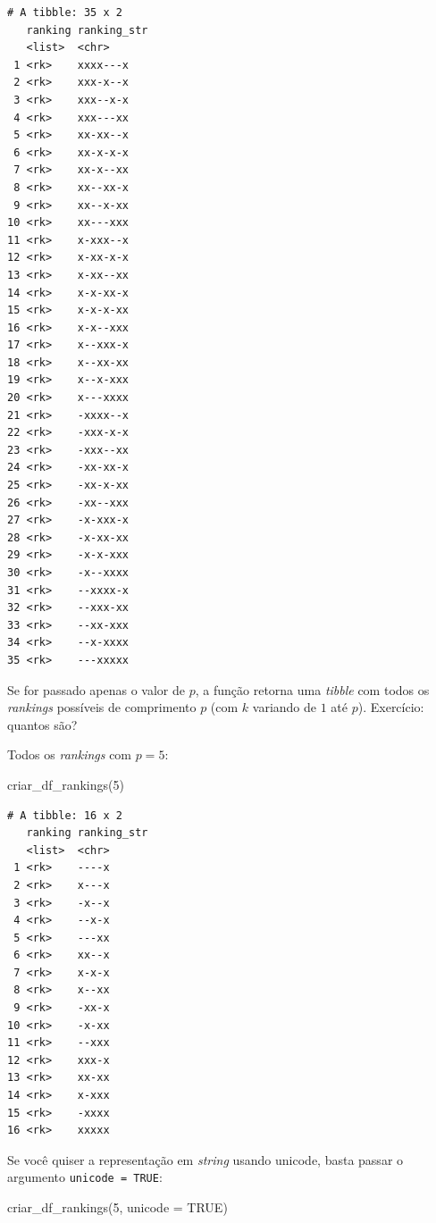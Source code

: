 \documentclass[
  letterpaper,
  DIV=11,
  numbers=noendperiod]{scrreprt}
\newenvironment{Shaded}{\begin{snugshade}}{\end{snugshade}}
\newcommand{\AttributeTok}[1]{\textcolor[rgb]{0.40,0.45,0.13}{#1}}
\newcommand{\ConstantTok}[1]{\textcolor[rgb]{0.56,0.35,0.01}{#1}}
\newcommand{\DecValTok}[1]{\textcolor[rgb]{0.68,0.00,0.00}{#1}}
\newcommand{\FunctionTok}[1]{\textcolor[rgb]{0.28,0.35,0.67}{#1}}
\newcommand{\NormalTok}[1]{\textcolor[rgb]{0.00,0.23,0.31}{#1}}
\begin{document}
\begin{verbatim}
# A tibble: 35 x 2
   ranking ranking_str
   <list>  <chr>      
 1 <rk>    xxxx---x   
 2 <rk>    xxx-x--x   
 3 <rk>    xxx--x-x   
 4 <rk>    xxx---xx   
 5 <rk>    xx-xx--x   
 6 <rk>    xx-x-x-x   
 7 <rk>    xx-x--xx   
 8 <rk>    xx--xx-x   
 9 <rk>    xx--x-xx   
10 <rk>    xx---xxx   
11 <rk>    x-xxx--x   
12 <rk>    x-xx-x-x   
13 <rk>    x-xx--xx   
14 <rk>    x-x-xx-x   
15 <rk>    x-x-x-xx   
16 <rk>    x-x--xxx   
17 <rk>    x--xxx-x   
18 <rk>    x--xx-xx   
19 <rk>    x--x-xxx   
20 <rk>    x---xxxx   
21 <rk>    -xxxx--x   
22 <rk>    -xxx-x-x   
23 <rk>    -xxx--xx   
24 <rk>    -xx-xx-x   
25 <rk>    -xx-x-xx   
26 <rk>    -xx--xxx   
27 <rk>    -x-xxx-x   
28 <rk>    -x-xx-xx   
29 <rk>    -x-x-xxx   
30 <rk>    -x--xxxx   
31 <rk>    --xxxx-x   
32 <rk>    --xxx-xx   
33 <rk>    --xx-xxx   
34 <rk>    --x-xxxx   
35 <rk>    ---xxxxx   
\end{verbatim}

Se for passado apenas o valor de $p$, a função retorna uma \emph{tibble}
com todos os \emph{rankings} possíveis de comprimento $p$ (com $k$
variando de $1$ até $p$). Exercício: quantos são?

Todos os \emph{rankings} com $p = 5$:

\begin{Shaded}
\begin{Highlighting}[]
\FunctionTok{criar\_df\_rankings}\NormalTok{(}\DecValTok{5}\NormalTok{)}
\end{Highlighting}
\end{Shaded}

\begin{verbatim}
# A tibble: 16 x 2
   ranking ranking_str
   <list>  <chr>      
 1 <rk>    ----x      
 2 <rk>    x---x      
 3 <rk>    -x--x      
 4 <rk>    --x-x      
 5 <rk>    ---xx      
 6 <rk>    xx--x      
 7 <rk>    x-x-x      
 8 <rk>    x--xx      
 9 <rk>    -xx-x      
10 <rk>    -x-xx      
11 <rk>    --xxx      
12 <rk>    xxx-x      
13 <rk>    xx-xx      
14 <rk>    x-xxx      
15 <rk>    -xxxx      
16 <rk>    xxxxx      
\end{verbatim}

Se você quiser a representação em \emph{string} usando unicode, basta
passar o argumento \texttt{unicode\ =\ TRUE}:

\begin{Shaded}
\begin{Highlighting}[]
\FunctionTok{criar\_df\_rankings}\NormalTok{(}\DecValTok{5}\NormalTok{, }\AttributeTok{unicode =} \ConstantTok{TRUE}\NormalTok{)}
\end{Highlighting}
\end{Shaded}
\end{document}

